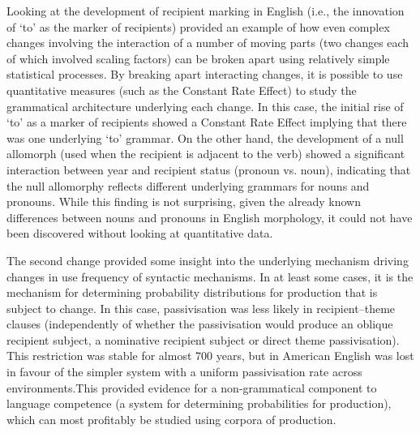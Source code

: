 	Looking at the development of recipient marking in English (i.e., the innovation of `to' as the marker of recipients) provided an example of how even complex changes involving the interaction of a number of moving parts (two changes each of which involved scaling factors) can be broken apart using relatively simple statistical processes. By breaking apart interacting changes, it is possible to use quantitative measures (such as the Constant Rate Effect) to study the grammatical architecture underlying each change. In this case, the initial rise of `to' as a marker of recipients showed a Constant Rate Effect implying that there was one underlying `to' grammar. On the other hand, the development of a null allomorph (used when the recipient is adjacent to the verb) showed a significant interaction between year and recipient status (pronoun vs. noun), indicating that the null allomorphy reflects different underlying grammars for nouns and pronouns. While this finding is not surprising, given the already known differences between nouns and pronouns in English morphology, it could not have been discovered without looking at quantitative data.
	
	The second change provided some insight into the underlying mechanism driving changes in use frequency of syntactic mechanisms. In at least some cases, it is the mechanism for determining probability distributions for production that is subject to change. In this case, passivisation was less likely in recipient--theme clauses (independently of whether the passivisation would produce an oblique recipient subject, a nominative recipient subject or direct theme passivisation). This restriction was stable for almost 700 years, but in American English was lost in favour of the simpler system with a uniform passivisation rate across environments.This provided evidence for a non-grammatical component to language competence (a system for determining probabilities for production), which can most profitably be studied using corpora of production.

%

